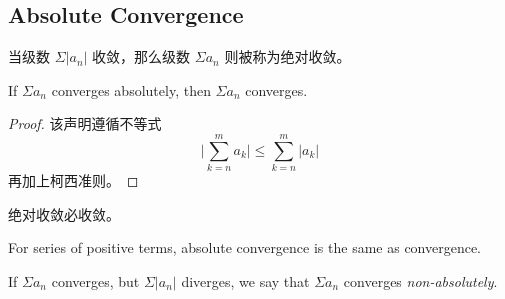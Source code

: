 \documentclass[../poma-notes.tex]{subfiles}
\begin{document}
\subsection*{Absolute Convergence}

当级数 $\Sigma |a_n|$ 收敛，那么级数 $\Sigma a_n$ 则被称为绝对收敛。

\begin{theorem}
  If $\Sigma a_n$ converges absolutely, then $\Sigma a_n$ converges.
\end{theorem}

\begin{proof}
  该声明遵循不等式
  \[
    \Biggl| \sum_{k=n}^{m} a_k \Biggr| \le \sum_{k=n}^{m} |a_k|
  \]
  再加上柯西准则。
\end{proof}

\begin{anote}
  绝对收敛必收敛。
\end{anote}

\begin{remarks}
  For series of positive terms, absolute convergence is the same as convergence.

  If $\Sigma a_n$ converges, but $\Sigma |a_n|$ diverges, we say that $\Sigma a_n$ converges \textit{non-absolutely}.
\end{remarks}
\end{document}
